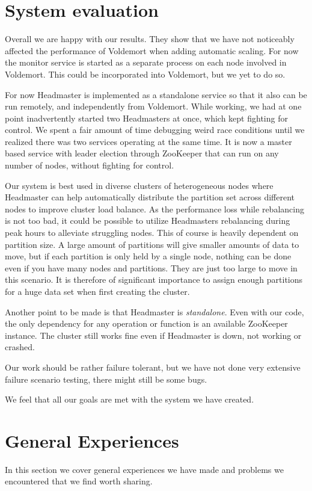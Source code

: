 \section{System evaluation}
\label{eval:discussion}
Overall we are happy with our results. They show that we have not noticeably affected the performance of Voldemort when adding automatic scaling. For now the monitor service is started as a separate process on each node involved in Voldemort. This could be incorporated into Voldemort, but we yet to do so.  

For now Headmaster is implemented as a standalone service so that it also can be run remotely, and independently from Voldemort.
While working, we had at one point inadvertently started two Headmasters at once, which kept fighting for control.
We spent a fair amount of time debugging weird race conditions until we realized there was two services operating at the same time.
It is now a master based service with leader election through ZooKeeper that can run on any number of nodes, without fighting for control.

Our system is best used in diverse clusters of heterogeneous nodes where Headmaster can help automatically distribute the partition set across different nodes to improve cluster load balance. As the performance loss while rebalancing is not too bad, it could be possible to utilize Headmasters rebalancing during peak hours to alleviate struggling nodes. This of course is heavily dependent on partition size. A large amount of partitions will give smaller amounts of data to move, but if each partition is only held by a single node, nothing can be done even if you have many nodes and partitions. They are just too large to move in this scenario. It is therefore of significant importance to assign enough partitions for a huge data set when first creating the cluster.

Another point to be made is that Headmaster is \emph{standalone}. Even with our code, the only dependency for any operation or function is an available ZooKeeper instance. The cluster still works fine even if Headmaster is down, not working or crashed.

Our work should be rather failure tolerant, but we have not done very extensive failure scenario testing, there might still be some bugs. 

We feel that all our goals are met with the system we have created.

\section{General Experiences}
\label{eval:exp}
In this section we cover general experiences we have made and problems we encountered that we find worth sharing. 

